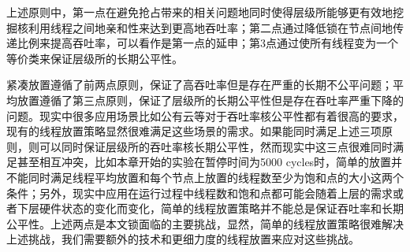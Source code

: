上述原则中，第一点在避免抢占带来的相关问题地同时使得层级所能够更有效地挖掘核利用线程之间地亲和性来达到更高地吞吐率；第二点通过降低锁在节点间地传递比例来提高吞吐率，可以看作是第一点的延申；第3点通过使所有线程变为一个等价类来保证层级所的长期公平性。

紧凑放置遵循了前两点原则，保证了高吞吐率但是存在严重的长期不公平问题；平均放置遵循了第三点原则，保证了层级所的长期公平性但是存在吞吐率严重下降的问题。现实中很多应用场景比如公有云等对于吞吐率核公平性都有着很高的要求，现有的线程放置策略显然很难满足这些场景的需求。如果能同时满足上述三项原则，则可以同时保证层级所的吞吐率核长期公平性，然而现实中这三点很难同时满足甚至相互冲突，比如本章开始的实验在暂停时间为5000 cycles时，简单的放置并不能同时满足线程平均放置和每个节点上放置的线程数至少为饱和点的大小这两个条件；另外，现实中应用在运行过程中线程数和饱和点都可能会随着上层的需求或者下层硬件状态的变化而变化，简单的线程放置策略并不能总是保证吞吐率和长期公平性。上述两点是本文锁面临的主要挑战，显然，简单的线程放置策略很难解决上述挑战，我们需要额外的技术和更细力度的线程放置来应对这些挑战。
